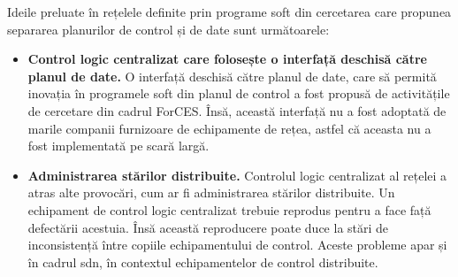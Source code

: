 Ideile preluate în rețelele definite prin programe soft din cercetarea care propunea separarea planurilor de control și de date sunt următoarele:
\begin{itemize}
	\item \textbf{Control logic centralizat care folosește o interfață deschisă către planul de date.} O interfață deschisă către planul de date, care să permită inovația în programele soft din planul de control a fost propusă de activitățile de cercetare din cadrul ForCES. Însă, această interfață nu a fost adoptată de marile companii furnizoare de echipamente de rețea, astfel că aceasta nu a fost implementată pe scară largă.
	\item \textbf{Administrarea stărilor distribuite.} Controlul logic centralizat al rețelei a atras alte provocări, cum ar fi administrarea stărilor distribuite. Un echipament de control logic centralizat trebuie reprodus pentru a face față defectării acestuia. Însă această reproducere poate duce la stări de inconsistență între copiile echipamentului de control. Aceste probleme apar și în cadrul \gls{sdn}, în contextul echipamentelor de control distribuite.
\end{itemize}
